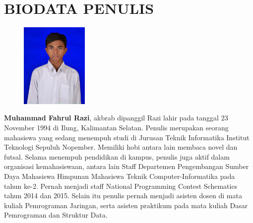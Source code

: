 \documentclass[12pt,oneside,reqno]{ta-its}
\begin{document}
	\frontmatter %
	\maketitle
	\legalityPaper %
	
    
	

	\cleardoublepage %

	\tableofcontents %
	\listoftables %
	\listoffigures %
	\lstlistoflistings %

	\mainmatter
	
	
	
	
	
	

	
	
    
    \renewcommand\chaptername{LAMPIRAN}
	\appendix
    
    

	\appendix

	\backmatter %
	\chapter{BIODATA PENULIS}
		\begin{figure}
			\includegraphics[width=0.29\textwidth]{Images/MFR.jpg}
		\end{figure}
		
		\textbf{Muhammad Fahrul Razi}, akbrab dipanggil Razi lahir pada tanggal 23 November 1994 di Ilung, Kalimantan Selatan. Penulis merupakan seorang mahasiswa yang sedang menempuh studi di Jurusan Teknik Informatika Institut Teknologi Sepuluh Nopember. Memiliki hobi antara lain membaca novel dan futsal. Selama menempuh pendidikan di kampus, penulis juga aktif dalam organisasi kemahasiswaan, antara lain Staff Departemen Pengembangan Sumber Daya Mahasiswa Himpunan Mahasiswa Teknik Computer-Informatika pada tahun ke-2. Pernah menjadi staff National Programming Contest Schematics tahun 2014 dan 2015. Selain itu penulis pernah menjadi asisten dosen di mata kuliah Pemrograman Jaringan, serta asisten praktikum pada mata kuliah Dasar Pemrograman dan Struktur Data.
\end{document}
